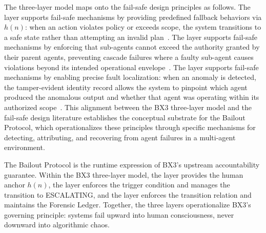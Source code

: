 The three-layer model maps onto the fail-safe design principles as follows. The \purpose{} layer supports fail-safe mechanisms by providing predefined fallback behaviors via $h(n)$: when an action violates policy or exceeds scope, the system transitions to a safe state rather than attempting an invalid plan~\cite{wiener1948}. The \bounds{} layer supports fail-safe mechanisms by enforcing that sub-agents cannot exceed the authority granted by their parent agents, preventing cascade failures where a faulty sub-agent causes violations beyond its intended operational envelope~\cite{dijkstra1982}. The \fact{} layer supports fail-safe mechanisms by enabling precise fault localization: when an anomaly is detected, the tamper-evident identity record allows the system to pinpoint which agent produced the anomalous output and whether that agent was operating within its authorized scope~\cite{tristr81}. This alignment between the BX3 three-layer model and the fail-safe design literature establishes the conceptual substrate for the Bailout Protocol, which operationalizes these principles through specific mechanisms for detecting, attributing, and recovering from agent failures in a multi-agent environment.

The Bailout Protocol is the runtime expression of BX3's upstream accountability guarantee. Within the BX3 three-layer model, the \purpose{} layer provides the human anchor $h(n)$, the \bounds{} layer enforces the trigger condition and manages the transition to ESCALATING, and the \fact{} layer enforces the transition relation and maintains the Forensic Ledger. Together, the three layers operationalize BX3's governing principle: systems fail upward into human consciousness, never downward into algorithmic chaos.